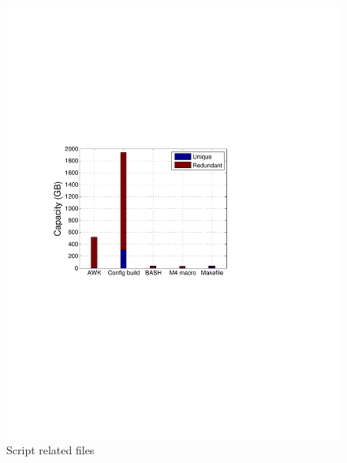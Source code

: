 \begin{figure}[t]
\begin{minipage}{0.3\textwidth}
		\includegraphics[width=1\textwidth]{graphs/type-script-cap}
		\caption{Script related files}
		\label{fig-file}
	\end{minipage}
	\begin{minipage}{0.3\textwidth}
		\centering

\end{minipage}
\end{figure}
